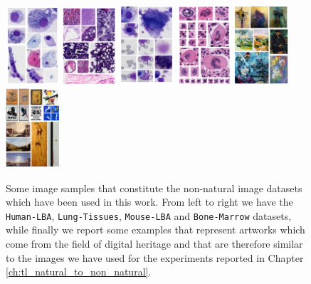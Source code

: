 \begin{figure}
  \centering
   \includegraphics[width=2cm,height=\textheight,keepaspectratio]{./Images/Chapter06/lba.pdf}%
  \includegraphics[width=2cm,height=\textheight,keepaspectratio]{./Images/Chapter06/tissus.pdf}%
  \includegraphics[width=2cm,height=\textheight,keepaspectratio]{./Images/Chapter06/mouse_lba.pdf}%
    \includegraphics[width=2cm,height=\textheight,keepaspectratio]{./Images/Chapter06/bonemarrow.pdf}%
  \includegraphics[width=2cm,height=\textheight,keepaspectratio]{./Images/Chapter06/artist.pdf}%
  \includegraphics[width=2cm,height=\textheight,keepaspectratio]{./Images/Chapter06/type.pdf}%
\caption{Some image samples that constitute the non-natural image datasets which have been used in this work.
From left to right we have the \texttt{Human-LBA}, \texttt{Lung-Tissues}, \texttt{Mouse-LBA} and \texttt{Bone-Marrow} datasets, while finally we report some examples that represent artworks which come from the field of digital heritage and that are therefore similar to the images we have used for the experiments reported in Chapter \ref{ch:tl_natural_to_non_natural}.}
\label{fig:dataset_images}
\end{figure}


